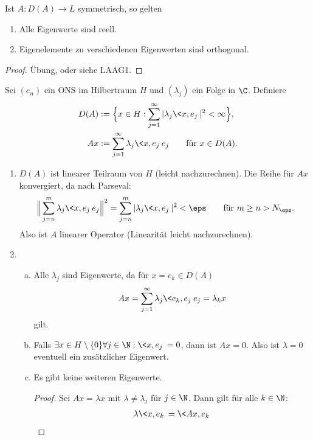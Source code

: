 \documentclass{mycourse}
\begin{document}
\begin{st} \label{1.18}
	Ist $A: D(A) \to L$ symmetrisch, so gelten
	\begin{enumerate}[1)]
		\item
			Alle Eigenwerte sind reell.
		\item
			Eigenelemente zu verschiedenen Eigenwerten sind orthogonal.
	\end{enumerate}
	\begin{proof}
		Übung, oder siehe LAAG1.
	\end{proof}
\end{st}

\begin{ex} \label{1.19}
	Sei $(e_n)$ ein ONS im Hilbertraum $H$ und $(\lambda_j)$ ein Folge in $\C$.
	Definiere
	\begin{align*}
		D(A) &:= \Big\{x \in H : \sum_{j=1}^\infty |\lambda_j \<x,e_j\> |^2 < \infty \Big\}, \\
		Ax &:= \sum_{j=1}^\infty \lambda_j \<x,e_j\> e_j \qquad \text{für } x \in D(A).
	\end{align*}
	\begin{enumerate}[1)]
		\item
			$D(A)$ ist linearer Teilraum von $H$ (leicht nachzurechnen).
			Die Reihe für $Ax$ konvergiert, da nach Parseval:
			\begin{align*}
				\Big\| \sum_{j=n}^m \lambda_j \<x,e_j\> e_j \Big\|^2
				= \sum_{j=n}^m |\lambda_j \<x,e_j\> |^2
				< \eps
				\qquad \text{für } m \ge n > N_\eps.
			\end{align*}
			Also ist $A$ linearer Operator (Linearität leicht nachzurechnen).
		\item
			\begin{enumerate}[a)]
				\item
					Alle $\lambda_j$ sind Eigenwerte, da für $x = e_k \in D(A)$
					\[
						Ax = \sum_{j=1}^\infty \lambda_j \<e_k,e_j\> e_j = \lambda_k x
					\]
					gilt.
				\item
					Falls $\exists x \in H\setminus \{0\} \forall j \in \N : \<x,e_j\> = 0$, dann ist $Ax = 0$.
					Also ist $\lambda = 0$ eventuell ein zusätzlicher Eigenwert.
				\item
					Es gibt keine weiteren Eigenwerte.
					\begin{proof}
						Sei $Ax = \lambda x$ mit $\lambda \neq \lambda_j$ für $j \in \N$.
						Dann gilt für alle $k \in \N$:
						\begin{align*}
							\lambda \<x,e_k\> 
							&= \<Ax, e_k\> \\ 

\end{align*}
\end{proof}
\end{enumerate}
\end{enumerate}
\end{ex}
\end{document}
